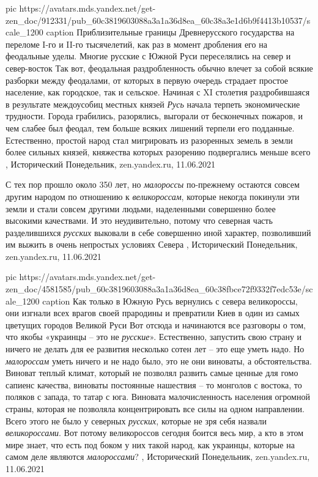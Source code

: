 \ifcmt
  pic https://avatars.mds.yandex.net/get-zen_doc/912331/pub_60c3819603088a3a1a36d8ea_60c38a3e1d6b9f4413b10537/scale_1200
  caption Приблизительные границы Древнерусского государства на переломе I-го и II-го тысячелетий, как раз в момент дробления его на феодальные уделы. Многие русские с Южной Руси переселялись на север и север-восток
\fi
Так вот, феодальная раздробленность обычно влечет за собой всякие разборки
между феодалами, от которых в первую очередь страдает простое население, как
городское, так и сельское. Начиная с XI столетия раздробившаяся в результате
междоусобиц местных князей \emph{Русь} начала терпеть экономические трудности. Города
грабились, разорялись, выгорали от бесконечных пожаров, и чем слабее был
феодал, тем больше всяких лишений терпели его подданные. Естественно, простой
народ стал мигрировать из разоренных земель в земли более сильных князей,
княжества которых разорению подвергались меньше всего
, 
Исторический Понедельник, zen.yandex.ru, 11.06.2021

С тех пор прошло около 350 лет, но \emph{малороссы} по-прежнему остаются совсем другим
народом по отношению к \emph{великороссам}, которые некогда покинули эти земли и стали
совсем другими людьми, наделенными совершенно более высокими качествами. И это
неудивительно, потому что северная часть разделившихся \emph{русских} выковали в себе
совершенно иной характер, позволивший им выжить в очень непростых условиях
Севера
, 
Исторический Понедельник, zen.yandex.ru, 11.06.2021

\ifcmt
  pic https://avatars.mds.yandex.net/get-zen_doc/4581585/pub_60c3819603088a3a1a36d8ea_60c38fbce72f9332f7edc53e/scale_1200
  caption Как только в Южную Русь вернулись с севера великороссы, они изгнали всех врагов своей прародины и превратили Киев в один из самых цветущих городов Великой Руси
\fi
Вот отсюда и начинаются все разговоры о том, что якобы «украинцы – это не
\emph{русские}». Естественно, запустить свою страну и ничего не делать для ее развития
несколько сотен лет – это еще уметь надо. Но \emph{малороссам} уметь ничего и не надо
было, это не они виноваты, а обстоятельства. Виноват теплый климат, который не
позволял развить самые ценные для гомо сапиенс качества, виноваты постоянные
нашествия – то монголов с востока, то поляков с запада, то татар с юга.
Виновата малочисленность населения огромной страны, которая не позволяла
концентрировать все силы на одном направлении.  Всего этого не было у северных
\emph{русских}, которые не зря себя назвали \emph{великороссами}. Вот потому великороссов
сегодня боится весь мир, а кто в этом мире знает, что есть под боком у них
такой народ, как украинцы, которые на самом деле являются \emph{малороссами}?
, 
Исторический Понедельник, zen.yandex.ru, 11.06.2021

